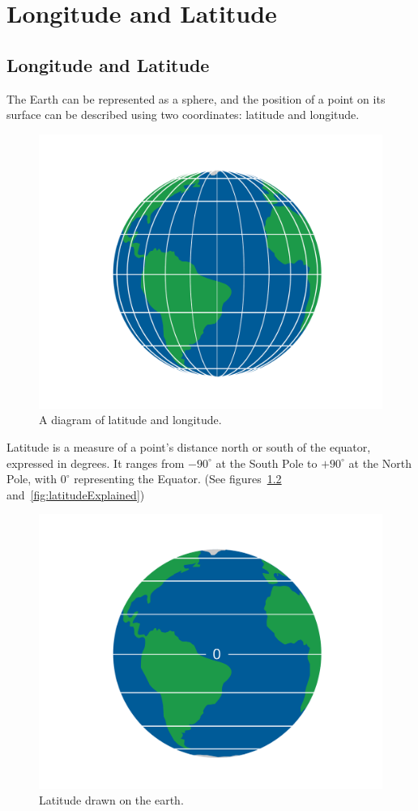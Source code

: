 \chapter{Longitude and Latitude}

\section{Longitude and Latitude}
The Earth can be represented as a sphere, and the position of a point
on its surface can be described using two coordinates: latitude and
longitude.

\begin{figure}[htbp]
    \centering
    \includegraphics[width=.75\textwidth]{latLon.png}
    \caption{A diagram of latitude and longitude.}
    \label{fig:latLon}
\end{figure}

Latitude is a measure of a point's distance north or south of the
equator, expressed in degrees. It ranges from $-90^{\circ}$ at the
South Pole to $+90^{\circ}$ at the North Pole, with $0^{\circ}$
representing the Equator. (See figures~\ref{fig:latitude} and~\ref{fig:latitudeExplained})
\begin{figure}[htbp]
  \centering
  \includegraphics[width=.75\textwidth]{lat.png}
  \caption{Latitude drawn on the earth.}
  \label{fig:latitude}
\end{figure}

